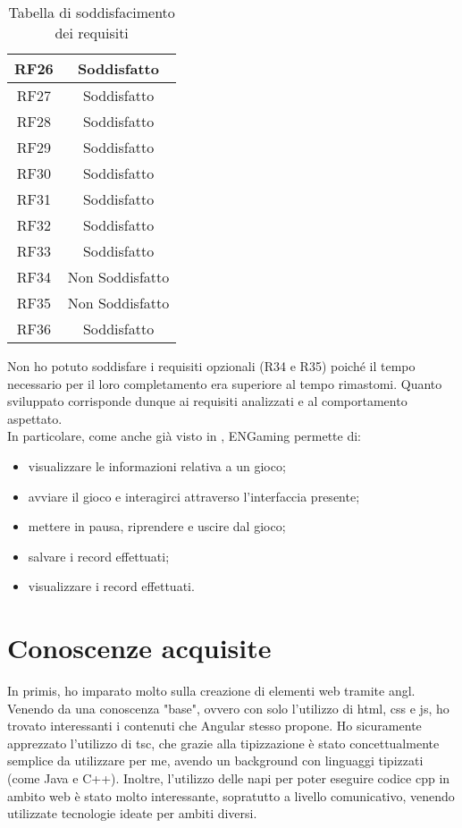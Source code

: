\begin{longtable}{|c|c|}
    \hline
    RF26&Soddisfatto\\
    \hline
    RF27&Soddisfatto\\
    \hline
    RF28&Soddisfatto\\
    \hline
    RF29&Soddisfatto\\
    \hline
    RF30&Soddisfatto\\
    \hline
    RF31&Soddisfatto\\
    \hline
    RF32&Soddisfatto\\
    \hline
    RF33&Soddisfatto\\
    \hline
    RF34&Non Soddisfatto\\
    \hline
    RF35&Non Soddisfatto\\
    \hline
    RF36&Soddisfatto
    \hline
    \caption{Tabella di soddisfacimento dei requisiti}
\end{longtable}
Non ho potuto soddisfare i requisiti opzionali (R34 e R35) poiché il tempo necessario per il loro completamento era superiore al tempo rimastomi.
Quanto sviluppato corrisponde dunque ai requisiti analizzati e al comportamento aspettato.\\
In particolare, come anche già visto in , ENGaming permette di:
\begin{itemize}
    \item visualizzare le informazioni relativa a un gioco;
    \item avviare il gioco e interagirci attraverso l'interfaccia presente;
    \item mettere in pausa, riprendere e uscire dal gioco;
    \item salvare i record effettuati;
    \item visualizzare i record effettuati.
\end{itemize}
\section{Conoscenze acquisite}
In primis, ho imparato molto sulla creazione di elementi web tramite \gls{angl}. Venendo da una conoscenza "base", ovvero con solo l'utilizzo di \gls{html}, \gls{css} e \gls{js}, ho trovato interessanti i contenuti che Angular stesso propone.
Ho sicuramente apprezzato l'utilizzo di \gls{tsc}, che grazie alla tipizzazione è stato concettualmente semplice da utilizzare per me, avendo un background con linguaggi tipizzati (come Java e C++).
Inoltre, l'utilizzo delle \gls{napi} per poter eseguire codice \gls{cpp} in ambito web è stato molto interessante, sopratutto a livello comunicativo, venendo utilizzate tecnologie ideate per ambiti diversi.
